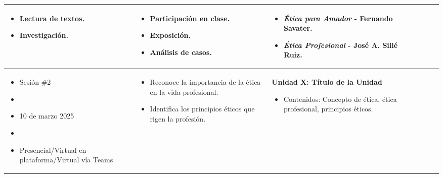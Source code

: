 \begin{landscape}
\begin{xltabular}{\linewidth}{@{}X@{}X@{}X@{}X@{}X@{}X@{}X@{}}
\begin{itemize}
            \item Lectura de textos.
            \item Investigación.
        \end{itemize}                             &
        \begin{itemize} %
            \item Participación en clase.
            \item Exposición.
            \item Análisis de casos.
        \end{itemize}                             &
        \begin{itemize} %
            \item \textit{Ética para Amador} - Fernando Savater.
            \item \textit{Ética Profesional} - José A. Silié Ruiz.
        \end{itemize}\\
        \midrule
        \begin{itemize}[label={}, left=0pt .. 0pt] %
            \item Sesión \#2
            \item
            \item 10 de marzo 2025
            \item
            \item Presencial/Virtual en plataforma/Virtual vía Teams
        \end{itemize} &
        \begin{itemize} %
            \item Reconoce la importancia de la ética en la vida profesional.
            \item Identifica los principios éticos que rigen la profesión.
        \end{itemize}          &
        \vspace{.015em}
        \textbf{Unidad X: Título de la Unidad} %
        \vspace{.5em}
        \begin{itemize} %
            \item Contenidos: Concepto de ética, ética profesional, principios éticos.
        \end{itemize} &
        \begin{itemize} %

\end{itemize}
\end{xltabular}
\end{landscape}
